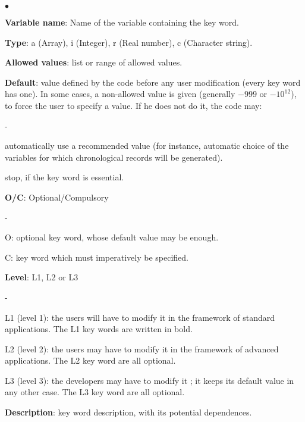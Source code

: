 \begin{list}{$\bullet$}{}
\item \textbf{Variable name}: Name of the variable containing the key word.

\item \textbf{Type}: a (Array), i (Integer), r (Real number), c
      (Character string).

\item \textbf{Allowed values}: list or range of allowed values.

\item \textbf{Default}: value defined by the code before any user
      modification (every key word has one). In some cases, a
      non-allowed value is given (generally $-999$ or $-10^{12}$), to force the
      user to specify a value. If he does not do it, the code may:
\begin{list}{-}{}
\item automatically use a recommended value (for instance, automatic
      choice of the variables for which chronological records will be
      generated).

\item stop, if the key word is essential.
\end{list}

\item \textbf{O/C}: Optional/Compulsory
\begin{list}{-}{}
\item O: optional key word, whose default value may be enough.

\item C: key word which must imperatively be specified.
\end{list}

\item \textbf{Level}: L1, L2 or L3
\begin{list}{-}{}
\item L1 (level 1): the users will have to modify it in the framework of
      standard applications. The L1 key words are written in bold.

\item L2 (level 2): the users may have to modify it in the framework of
      advanced applications. The L2 key word are all optional.

\item L3 (level 3): the developers may have to modify it ; it keeps its
      default value in any other case. The L3 key word are all optional.
\end{list}

\item \textbf{Description}:  key word description, with its potential
      dependences.

\end{list}

